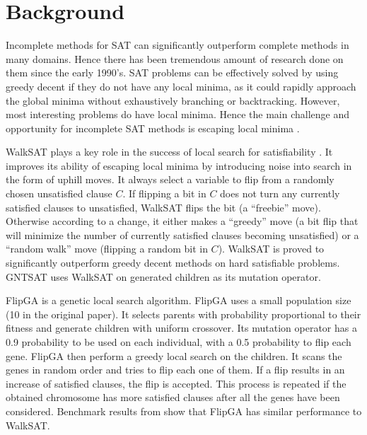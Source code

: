 \section{Background}
Incomplete methods for SAT can significantly outperform complete methods in
many domains. Hence there has been tremendous amount of research done on them
since the early 1990's. SAT problems can be effectively solved by using greedy
decent if they do not have any local minima, as it could rapidly approach the
global minima without exhaustively branching or backtracking. However, most
interesting problems do have local minima. Hence the main challenge and
opportunity for incomplete SAT methods is escaping local minima
\parencite{biere2009handbook}.

WalkSAT \parencite{selman1994noise} plays a key role in the success of local search
for satisfiability \parencite{biere2009handbook}. It improves its ability of escaping
local minima by introducing noise into search in the form of uphill moves. It
always select a variable to flip from a randomly chosen unsatisfied clause
$C$. If flipping a bit in $C$  does not
turn any currently satisfied clauses to unsatisfied, WalkSAT flips the bit (a
``freebie'' move). Otherwise according to a change, it either makes a
``greedy'' move (a bit flip that will minimize the number of currently
satisfied clauses becoming unsatisfied) or a ``random walk'' move (flipping a
random bit in $C$). WalkSAT is proved to significantly
outperform greedy decent methods on hard satisfiable problems. GNTSAT uses
WalkSAT on generated children as its mutation operator.

FlipGA \parencite{marchiori1999flipping} is a genetic local search algorithm. FlipGA uses
a small population size (10 in the original paper). It selects parents with
probability proportional  to their fitness and generate children with uniform
crossover. Its mutation operator has a 0.9 probability to be used on each
individual, with a 0.5 probability to flip each gene. FlipGA then perform a
greedy local search on the children. It scans the genes in random order and
tries to flip each one of them. If a flip results in an increase of satisfied
clauses, the flip is accepted. This process is repeated if the obtained
chromosome has more satisfied clauses after all the genes have been
considered. Benchmark results from \cite{gottlieb_marchiori_rossi_2002} show that FlipGA has
similar performance to WalkSAT.

